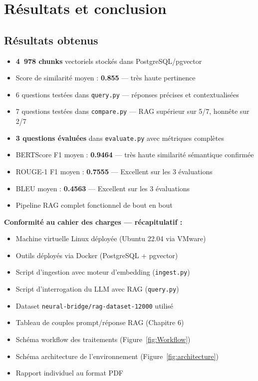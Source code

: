 \documentclass[12pt,a4paper]{report}
\begin{document}
\chapter{Résultats et conclusion}

\section{Résultats obtenus}

\begin{itemize}[leftmargin=1.5cm]
  \item \textbf{4~978 chunks} vectoriels stockés dans PostgreSQL/pgvector
  \item Score de similarité moyen : \textbf{0.855} — très haute pertinence
  \item 6 questions testées dans \texttt{query.py} — réponses précises et contextualisées
  \item 7 questions testées dans \texttt{compare.py} — RAG supérieur sur 5/7, honnête sur 2/7
  \item \textbf{3 questions évaluées} dans \texttt{evaluate.py} avec métriques complètes
  \item BERTScore F1 moyen : \textbf{0.9464} — très haute similarité sémantique confirmée
  \item ROUGE-1 F1 moyen : \textbf{0.7555} — Excellent sur les 3 évaluations
  \item BLEU moyen : \textbf{0.4563} — Excellent sur les 3 évaluations
  \item Pipeline RAG complet fonctionnel de bout en bout
\end{itemize}

\vspace{8pt}
\begin{resultbox}
\textbf{Conformité au cahier des charges — récapitulatif :}
\begin{itemize}[leftmargin=1cm]
  \item[$\checkmark$] Machine virtuelle Linux déployée (Ubuntu 22.04 via VMware)
  \item[$\checkmark$] Outils déployés via Docker (PostgreSQL + pgvector)
  \item[$\checkmark$] Script d'ingestion avec moteur d'embedding (\texttt{ingest.py})
  \item[$\checkmark$] Script d'interrogation du LLM avec RAG (\texttt{query.py})
  \item[$\checkmark$] Dataset \texttt{neural-bridge/rag-dataset-12000} utilisé
  \item[$\checkmark$] Tableau de couples prompt/réponse RAG (Chapitre 6)
  \item[$\checkmark$] Schéma workflow des traitements (Figure~\ref{fig:Workflow})
  \item[$\checkmark$] Schéma architecture de l'environnement (Figure~\ref{fig:architecture})
  \item[$\checkmark$] Rapport individuel au format PDF
\end{itemize}
\end{resultbox}
\end{document}
